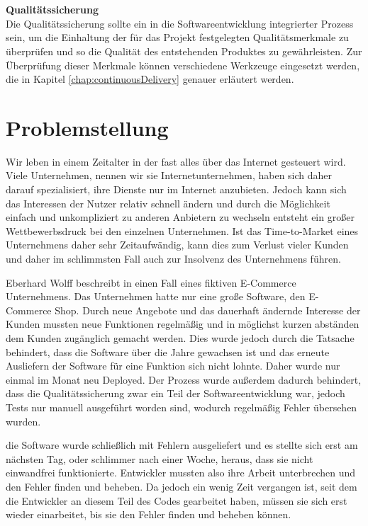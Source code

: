 \\\\
\textbf{Qualitätssicherung}\\
Die Qualitätssicherung sollte ein in die Softwareentwicklung integrierter Prozess sein, um die Einhaltung der für das Projekt festgelegten Qualitätsmerkmale zu überprüfen und so die Qualität des entstehenden Produktes zu gewährleisten. Zur Überprüfung dieser Merkmale können verschiedene Werkzeuge eingesetzt werden, die in Kapitel \ref{chap:continuousDelivery}  genauer erläutert werden.

\section{Problemstellung}
\label{sec:problemstellung}
Wir leben in einem Zeitalter in der fast alles über das Internet gesteuert wird. Viele Unternehmen, nennen wir sie Internetunternehmen, haben sich daher darauf spezialisiert, ihre Dienste nur im Internet anzubieten. Jedoch kann sich das Interessen der Nutzer relativ schnell ändern und durch die Möglichkeit einfach und unkompliziert zu anderen Anbietern zu wechseln entsteht ein großer Wettbewerbsdruck bei den einzelnen Unternehmen. Ist das Time-to-Market eines Unternehmens daher sehr Zeitaufwändig, kann dies zum Verlust vieler Kunden und daher im schlimmsten Fall auch zur Insolvenz des Unternehmens führen.

Eberhard Wolff beschreibt in \cite[S. 2 ff.]{EWolff:CD} einen Fall eines fiktiven E-Commerce Unternehmens.
Das Unternehmen hatte nur eine große Software, den E-Commerce Shop. Durch neue Angebote und das dauerhaft ändernde Interesse der Kunden mussten neue Funktionen regelmäßig und in möglichst kurzen abständen dem Kunden zugänglich gemacht werden. Dies wurde jedoch durch die Tatsache behindert, dass die Software über die Jahre gewachsen ist und das erneute Ausliefern der Software für eine Funktion sich nicht lohnte. Daher wurde nur einmal im Monat neu Deployed. Der Prozess wurde außerdem dadurch behindert, dass die Qualitätssicherung zwar ein Teil der Softwareentwicklung war, jedoch Tests nur manuell ausgeführt worden sind, wodurch regelmäßig Fehler übersehen wurden.

die Software wurde schließlich mit Fehlern ausgeliefert und es stellte sich erst am nächsten Tag, oder schlimmer nach einer Woche, heraus, dass sie nicht einwandfrei funktionierte. Entwickler mussten also ihre Arbeit unterbrechen und den Fehler finden und beheben. Da jedoch ein wenig Zeit vergangen ist, seit dem die Entwickler an diesem Teil des Codes gearbeitet haben, müssen sie sich erst wieder einarbeitet, bis sie den Fehler finden und beheben können.

